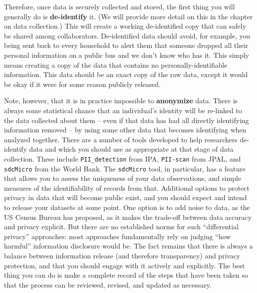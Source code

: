 Therefore, once data is securely collected and stored,
the first thing you will generally do is \textbf{de-identify} it.
(We will provide more detail on this in the chapter on data collection.)
This will create a working de-identified copy
that can safely be shared among collaborators.
De-identified data should avoid, for example,
you being sent back to every household
to alert them that someone dropped all their personal information
on a public bus and we don't know who has it.
This simply means creating a copy of the data
that contains no personally-identifiable information.
This data should be an exact copy of the raw data,
except it would be okay if it were for some reason publicly released.\cite{matthews2011data}

Note, however, that it is in practice impossible to \textbf{anonymize} data.
There is always some statistical chance that an individual's identity
will be re-linked to the data collected about them
-- even if that data has had all directly identifying information removed --
by using some other data that becomes identifying when analyzed together.
There are a number of tools developed to help researchers de-identify data
and which you should use as appropriate at that stage of data collection.
These include \texttt{PII\_detection} from IPA,
\texttt{PII-scan} from JPAL,
and \texttt{sdcMicro} from the World Bank.
The \texttt{sdcMicro} tool, in particular, has a feature
that allows you to assess the uniqueness of your data observations,
and simple measures of the identifiability of records from that.
Additional options to protect privacy in data that will become public exist,
and you should expect and intend to release your datasets at some point.
One option is to add noise to data, as the US Census Bureau has proposed,\cite{abowd2018us}
as it makes the trade-off between data accuracy and privacy explicit.
But there are no established norms for such ``differential privacy'' approaches:
most approaches fundamentally rely on judging ``how harmful'' information disclosure would be.
The fact remains that there is always a balance between information release (and therefore transparency)
and privacy protection, and that you should engage with it actively and explicitly.
The best thing you can do is make a complete record of the steps that have been taken
so that the process can be reviewed, revised, and updated as necessary.

